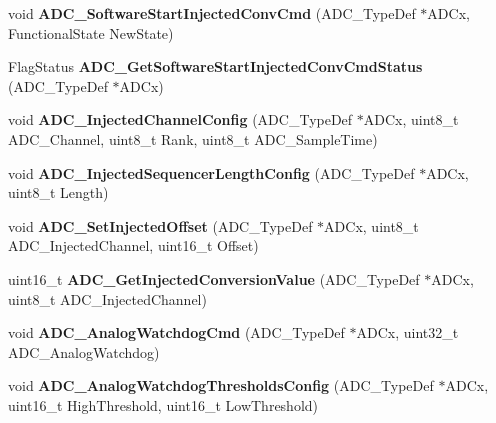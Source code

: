 \begin{DoxyCompactItemize}
\item 
\hypertarget{group__ADC__Exported__Functions_ga5b141d5dbf5f417a11dfa622c8c149d3}{
void {\bfseries ADC\_\-SoftwareStartInjectedConvCmd} (ADC\_\-TypeDef $\ast$ADCx, FunctionalState NewState)}
\label{group__ADC__Exported__Functions_ga5b141d5dbf5f417a11dfa622c8c149d3}

\item 
\hypertarget{group__ADC__Exported__Functions_ga8765f8835b8cfed13dce3d8d71767dcc}{
FlagStatus {\bfseries ADC\_\-GetSoftwareStartInjectedConvCmdStatus} (ADC\_\-TypeDef $\ast$ADCx)}
\label{group__ADC__Exported__Functions_ga8765f8835b8cfed13dce3d8d71767dcc}

\item 
\hypertarget{group__ADC__Exported__Functions_gae2b44bff080184e1cf6f2cb6b9bb3e59}{
void {\bfseries ADC\_\-InjectedChannelConfig} (ADC\_\-TypeDef $\ast$ADCx, uint8\_\-t ADC\_\-Channel, uint8\_\-t Rank, uint8\_\-t ADC\_\-SampleTime)}
\label{group__ADC__Exported__Functions_gae2b44bff080184e1cf6f2cb6b9bb3e59}

\item 
\hypertarget{group__ADC__Exported__Functions_ga24eba90bc3ee955e07659a605011710d}{
void {\bfseries ADC\_\-InjectedSequencerLengthConfig} (ADC\_\-TypeDef $\ast$ADCx, uint8\_\-t Length)}
\label{group__ADC__Exported__Functions_ga24eba90bc3ee955e07659a605011710d}

\item 
\hypertarget{group__ADC__Exported__Functions_ga07a942613088ab3ecfc3d97a20475920}{
void {\bfseries ADC\_\-SetInjectedOffset} (ADC\_\-TypeDef $\ast$ADCx, uint8\_\-t ADC\_\-InjectedChannel, uint16\_\-t Offset)}
\label{group__ADC__Exported__Functions_ga07a942613088ab3ecfc3d97a20475920}

\item 
\hypertarget{group__ADC__Exported__Functions_ga1dea5ed24571a2e0ce4cbd41c9c1ec46}{
uint16\_\-t {\bfseries ADC\_\-GetInjectedConversionValue} (ADC\_\-TypeDef $\ast$ADCx, uint8\_\-t ADC\_\-InjectedChannel)}
\label{group__ADC__Exported__Functions_ga1dea5ed24571a2e0ce4cbd41c9c1ec46}

\item 
\hypertarget{group__ADC__Exported__Functions_gad017d69bec6e497afd35ba25ea22d86e}{
void {\bfseries ADC\_\-AnalogWatchdogCmd} (ADC\_\-TypeDef $\ast$ADCx, uint32\_\-t ADC\_\-AnalogWatchdog)}
\label{group__ADC__Exported__Functions_gad017d69bec6e497afd35ba25ea22d86e}

\item 
\hypertarget{group__ADC__Exported__Functions_ga79588d02aa8e4147f21cb90a4708366d}{
void {\bfseries ADC\_\-AnalogWatchdogThresholdsConfig} (ADC\_\-TypeDef $\ast$ADCx, uint16\_\-t HighThreshold, uint16\_\-t LowThreshold)}
\label{group__ADC__Exported__Functions_ga79588d02aa8e4147f21cb90a4708366d}


\end{DoxyCompactItemize}
